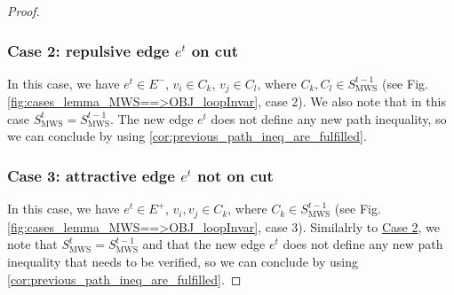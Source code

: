\begin{proof}
\subsubsection*{Case 2: repulsive edge $e^t$ on cut}\label{case:repuslive_edge_on_cut}
In this case, we have $e^{t}\in E^{-}$, $v_{i}\in C_{k}$,
$v_{j}\in C_{l}$, where $C_{k},C_{l}\in S_{\mathrm{MWS}}^{t-1}$ (see Fig. \ref{fig:cases_lemma_MWS==>OBJ_loopInvar}, case 2). We also note that in this case $S_{\mathrm{MWS}}^{t}=S_{\mathrm{MWS}}^{t-1}$. The new edge $e^t$ does not define any new path inequality, so we can conclude by using \autoref{cor:previous_path_ineq_are_fulfilled}. 



\subsubsection*{Case 3: attractive edge $e^t$ not on cut}\label{case:attractive_edge_not_on_cut}
In this case, we have $e^{t}\in E^{+}$, $v_{i}, v_j\in C_{k}$, where $C_{k}\in S_{\mathrm{MWS}}^{t-1}$ (see Fig. \ref{fig:cases_lemma_MWS==>OBJ_loopInvar}, case 3). Similalrly to \hyperref[case:repuslive_edge_on_cut]{Case 2}, we note that $S_{\mathrm{MWS}}^{t}=S_{\mathrm{MWS}}^{t-1}$ and that the new edge $e^t$ does not define any new path inequality that needs to be verified, so we can conclude by using \autoref{cor:previous_path_ineq_are_fulfilled}. 


\end{proof}
